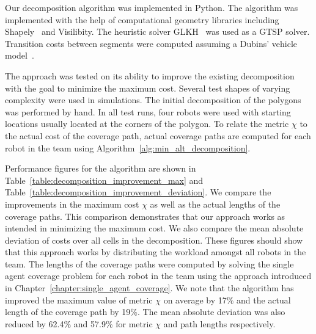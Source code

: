 \documentclass[../main.tex]{subfiles}
\begin{document}
Our decomposition algorithm was implemented in Python. The algorithm was implemented with the help of computational geometry libraries including Shapely~\cite{Shapely:13} and Visilibity\cite{VisiLibity:08}. The heuristic solver GLKH~\cite{helsgaun2000effective} was used as a GTSP solver. Transition costs between segments were computed assuming a Dubins' vehicle model~\cite{dubins1957curves}.

The approach was tested on its ability to improve the existing decomposition with the goal to minimize the maximum cost. Several test shapes of varying complexity were used in simulations. The initial decomposition of the polygons was performed by hand. In all test runs, four robots were used with starting locations usually located at the corners of the polygon. To relate the metric $\chi$ to the actual cost of the coverage path, actual coverage paths are computed for each robot in the team using Algorithm~\ref{alg:min_alt_decomposition}.

Performance figures for the algorithm are shown in Table~\ref{table:decomposition_improvement_max} and Table~\ref{table:decomposition_improvement_deviation}. We compare the improvements in the maximum cost $\chi$ as well as the actual lengths of the coverage paths. This comparison demonstrates that our approach works as intended in minimizing the maximum cost. We also compare the mean absolute deviation of costs over all cells in the decomposition. These figures should show that this approach works by distributing the workload amongst all robots in the team. The lengths of the coverage paths were computed by solving the single agent coverage problem for each robot in the team using the approach introduced in Chapter~\ref{chapter:single_agent_coverage}. We note that the algorithm has improved the maximum value of metric $\chi$ on average by 17\% and the actual length of the coverage path by 19\%. The mean absolute deviation was also reduced by 62.4\% and 57.9\% for metric $\chi$ and path lengths respectively.
\end{document}
